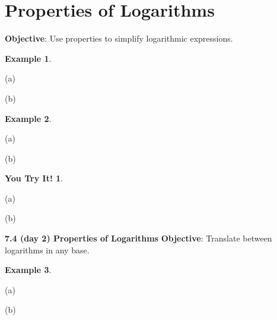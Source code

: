 \documentclass{report}
\theoremstyle{definition}
\newtheorem{example}{\bf Example}
\newtheorem{youtry}{\bf You Try It!}
\begin{document}
 \section{Properties of Logarithms}
 \indent\hfill\small\noindent \textbf{Objective}:  Use properties to simplify logarithmic expressions. \normalsize\\
 \setcounter{example}{0}
 \setcounter{definition}{0}
 
\begin{example}
\end{example}
\begin{minipage}[t]{0.45\linewidth}
 (a) 
\end{minipage}
\begin{minipage}[t]{0.45\linewidth}
 (b) 
\end{minipage}
\vfill

\begin{example}

\end{example}
\begin{minipage}[t]{0.45\linewidth}
 (a) 
\end{minipage}
\begin{minipage}[t]{0.45\linewidth}
 (b) 
\end{minipage}
\vfill
\begin{youtry}

\end{youtry}
\begin{minipage}[t]{0.45\linewidth}
 (a) 
\end{minipage}
\begin{minipage}[t]{0.45\linewidth}
 (b) 
\end{minipage}
\vfill

\vfill
 \noindent{}
 \newpage

\noindent\Large{\textbf{7.4 (day 2) Properties of Logarithms}} 
\indent\hfill\small\noindent \textbf{Objective}: Translate between logarithms in any base.  \normalsize\\

\begin{example}

\end{example}

\begin{minipage}[t]{0.45\linewidth}
 (a) 
\end{minipage}
\begin{minipage}[t]{0.45\linewidth}
 (b) 
\end{minipage}
\vfill
\end{document}
